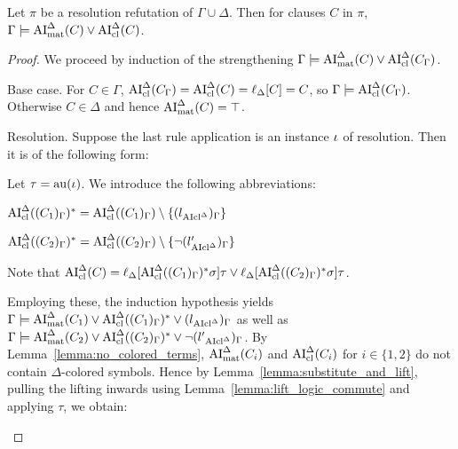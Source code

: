 \documentclass[,%
	draft=false,%
	numbers=noendperiod
	11pt,
	a4paper,
	oneside,%
	openany,
]{memoir}
\begin{document}
\begin{lemma}
	\label{lemma:gamma_entails_aide}
	Let $\pi$ be a resolution refutation of $\Gamma\cup\Delta$.
	Then for clauses $C$ in\nolinebreak{} $\pi$,
	$\Gamma\entails\nolinebreak \AImatde(C) \lor\nolinebreak \AIclde(C)$.
\end{lemma}
\begin{proof}
	We proceed by induction of the strengthening $\Gamma\models \operatorname{AI}_\mathrm{mat}^\Delta(C) \lor \operatorname{AI}_\mathrm{cl}^\Delta(C_\Gamma)$\footnotemark.

	\begin{description}
		\item{Base case.}
			For $C\in \Gamma$, $\operatorname{AI}_\mathrm{cl}^\Delta(C_\Gamma) = \operatorname{AI}_\mathrm{cl}^\Delta(C) = \ell_{\Delta}[C] = C$, so $\Gamma \models \operatorname{AI}_\mathrm{cl}^\Delta(C_\Gamma)$.
			Otherwise $C \in \Delta$ and hence $\operatorname{AI}_\mathrm{mat}^\Delta(C) = \top$.

		\item{Resolution.}
			Suppose the last rule application is an instance $\iota$ of resolution. Then it is of the following form:
			\begin{prooftree}
			\end{prooftree}

			Let 
			$\tau = \operatorname{au}(\iota)$.
			We introduce the following abbreviations:

			\newcommand{\clauseOnePrime}{\AIclausede((C_1)_\Gamma)^*}
			\newcommand{\clauseTwoPrime}{\AIclausede((C_2)_\Gamma)^*}


			$ \clauseOnePrime = \AIclausede((C_1)_\Gamma) \setminus \{{(l{\fromclausede})_\Gamma}\}$

			$ \clauseTwoPrime = \AIclausede((C_2)_\Gamma)\setminus \{{\lnot (l{\fromclausede'})_\Gamma}\}$

			Note that $\AIclde(C) = \lifdeltanovar{ \clauseOnePrime\sigma} \tau \lor \lifdeltanovar{ \clauseTwoPrime\sigma} \tau$.

			Employing these, the induction hypothesis yields 
			$\Gamma \entails \AImatrixde(C_1) \lor \clauseOnePrime \lor {(l{\fromclausede})_\Gamma}$
			as well as
			$\Gamma \entails \AImatrixde(C_2) \lor \clauseTwoPrime \lor {\lnot (l'{\fromclausede})_\Gamma}$.
			By Lemma~\ref{lemma:no_colored_terms}, $\operatorname{AI}_\mathrm{mat}^\Delta(C_i)$ and $\operatorname{AI}_\mathrm{cl}^\Delta(C_i)$ for $i\in\{1,2\}$ do not contain $\Delta$-colored symbols.
			Hence by Lemma~\ref{lemma:substitute_and_lift}, pulling the lifting inwards using Lemma~\ref{lemma:lift_logic_commute} and applying $\tau$, we obtain:


\end{description}
\end{proof}
\end{document}
